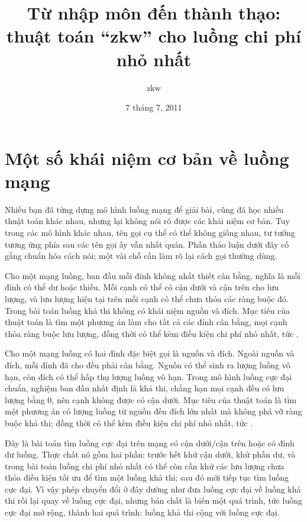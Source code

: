 \documentclass[11pt]{article}
\title{Từ nhập môn đến thành thạo: thuật toán ``zkw'' cho luồng chi phí nhỏ nhất}
\author{zkw}
\date{7 tháng 7, 2011}
\begin{document}
\maketitle


\section{Một số khái niệm cơ bản về luồng mạng}

Nhiều bạn đã từng dựng mô hình luồng mạng để giải bài, cũng đã học nhiều thuật
toán khác nhau, nhưng lại không nói rõ được các khái niệm cơ bản. Tuy trong
các mô hình khác nhau, tên gọi cụ thể có thể không giống nhau, tư tưởng tương
ứng phía sau các tên gọi ấy vẫn nhất quán. Phần thảo luận dưới đây cố gắng
chuẩn hóa cách nói; một vài chỗ cần làm rõ lại cách gọi thường dùng.

 Cho một mạng luồng, ban đầu mỗi đỉnh không nhất
thiết cân bằng, nghĩa là mỗi đỉnh có thể dư hoặc thiếu. Mỗi cạnh có thể có cận
dưới và cận trên cho lưu lượng, và lưu lượng hiện tại trên mỗi cạnh có thể
chưa thỏa các ràng buộc đó. Trong bài toán luồng khả thi không có khái niệm
nguồn và đích. Mục tiêu của thuật toán là tìm một phương án làm cho tất cả
các đỉnh cân bằng, mọi cạnh thỏa ràng buộc lưu lượng, đồng thời có thể kèm
điều kiện chi phí nhỏ nhất, tức .

 Cho một mạng luồng có hai đỉnh đặc biệt gọi là
nguồn và đích. Ngoài nguồn và đích, mỗi đỉnh đã cho đều phải cân bằng. Nguồn
có thể sinh ra lượng luồng vô hạn, còn đích có thể hấp thụ lượng luồng vô hạn.
Trong mô hình luồng cực đại chuẩn, nghiệm ban đầu nhất định là khả thi, chẳng
hạn mọi cạnh đều có lưu lượng bằng $0$, nên cạnh không được có cận dưới. Mục
tiêu của thuật toán là tìm một phương án có lượng luồng từ nguồn đến đích lớn
nhất mà không phá vỡ ràng buộc khả thi; đồng thời có thể kèm điều kiện chi phí
nhỏ nhất, tức .

 Đây là bài toán tìm luồng cực đại trên mạng có
cận dưới/cận trên hoặc có đỉnh dư luồng. Thực chất nó gồm hai phần: trước hết
khử cận dưới, khử phần dư, và trong bài toán luồng chi phí nhỏ nhất có thể còn
cần khử các lưu lượng chưa thỏa điều kiện tối ưu để tìm một luồng khả thi; sau
đó mới tiếp tục tìm luồng cực đại. Vì vậy phép chuyển đổi ở đây dường như đưa
luồng cực đại về luồng khả thi rồi lại quay về luồng cực đại, nhưng bản chất
là biến một quá trình, tức luồng cực đại mở rộng, thành hai quá trình: luồng
khả thi cộng với luồng cực đại.
\end{document}

